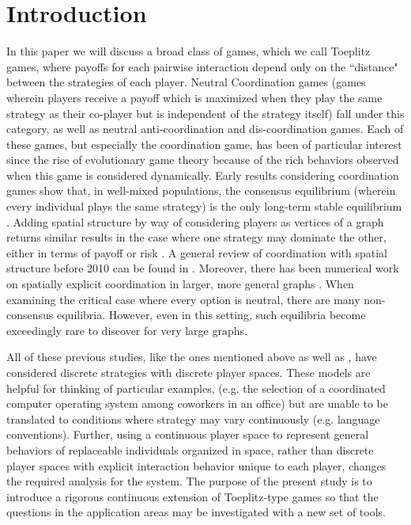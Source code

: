 \documentclass[aps,
preprint,
groupedaddress,
showkeys,
amsmath]{revtex4-2}
\begin{document}
\section{Introduction}\label{SEC:Introduction}
In this paper we will discuss a broad class of games, which we call Toeplitz games, where payoffs for each pairwise interaction depend only on the  ``distance" between the strategies of each player. Neutral Coordination games (games wherein players receive a payoff which is maximized when they play the same strategy as their co-player but is independent of the strategy itself) fall under this category, as well as neutral anti-coordination and dis-coordination games.  Each of these games, but especially the coordination game, has been of particular interest since the rise of evolutionary game theory because of the rich behaviors observed when this game is considered dynamically. 
Early results considering coordination games show that, in well-mixed populations, the consensus equilibrium (wherein every individual plays the same strategy) is the only long-term stable equilibrium \cite{Kandori1993}. Adding spatial structure by way of considering players as vertices of a graph returns similar results in the case where one strategy may dominate the other, either in terms of payoff or risk \cite{Ellison1993, Ellison2000}. A general review of coordination with spatial structure before 2010 can be found in \cite{Weidenholzer}. Moreover, there has been numerical work on spatially explicit coordination in larger, more general graphs \cite{Buskens2016, Raducha2022, McAlister2024}. When examining the critical case where every option is neutral, there are many non-consensus equilibria. However, even in this setting, such equilibria become exceedingly rare to discover for very large graphs.

All of these previous studies, like the ones mentioned above as well as \cite{Arditti2024,Berninghaus2010,Clauset2004, Ely2002,Gilboa1991,Oechssler1997,Oechssler1999,Robson1995}, have considered discrete strategies with discrete player spaces. These models are helpful for thinking of particular examples, (e.g. the selection of a coordinated computer operating system among coworkers in an office) but are unable to be translated to conditions where strategy may vary continuously (e.g. language conventions). Further, using a continuous player space to represent general behaviors of replaceable individuals organized in space, rather than discrete player spaces with explicit interaction behavior unique to each player, changes the required analysis for the system. The purpose of the present study is to introduce a rigorous continuous extension of Toeplitz-type games so that the questions in the application areas may be investigated with a new set of tools.
\end{document}
